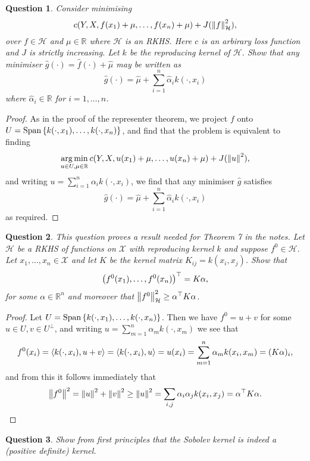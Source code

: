 \documentclass{article}
\theoremstyle{plain}
\newtheorem{question}{Question}
\theoremstyle{remark}
\newcommand{\Bb}{\mathbb}
\newcommand{\Cal}{\mathcal}
\newcommand{\RR}{\Bb R}
\newcommand\XX{\Cal X}
\newcommand\HH{\Cal H}
\DeclarePairedDelimiter{\ang}{\langle}{\rangle}
\newcommand{\T}{^\top} %
\renewcommand\P{^\perp}
\DeclareMathOperator{\Span}{Span}
\DeclareMathOperator*{\argmin}{arg\,min}
\begin{document}
\begin{question}
	Consider minimising
	\[
	c(Y, X, f(x_1) + \mu, \dotsc, f(x_n) + \mu) + J(\norm{f}^2_\HH),
	\]
	over $f \in \HH$ and $\mu \in \RR$ where $\HH$ is an RKHS. Here $c$ is an arbirary loss function and $J$ is strictly increasing. Let $k$ be the reproducing kernel of $\HH$. Show that any minimiser $\hat g(\cdot) = \hat f(\cdot) + \hat \mu$ may be written as
	\[
	\hat g(\cdot) = \hat \mu + \sum_{i=1}^n \hat\alpha_i k(\cdot, x_i)
	\]
	where $\hat\alpha_i \in \RR$ for $i = 1, \dotsc, n$. 
\end{question}

\begin{proof}
	As in the proof of the representer theorem, we project $f$ onto $U = \Span\qty{k(\cdot, x_1), \dotsc, k(\cdot, x_n)}$, and find that the problem is equivalent to finding
	\[
	\argmin_{u \in U, \mu \in \RR} c(Y, X, u(x_1) + \mu, \dotsc, u(x_n) + \mu) + J(\norm{u}^2),
	\]
	and writing $u = \sum_{i=1}^n \alpha_i k(\cdot, x_i)$, we find that any minimiser $\hat g$ satisfies
	\[
	\hat g(\cdot) = \hat \mu +  \sum_{i=1}^n \hat\alpha_i k(\cdot, x_i)
	\]
	as required. 
\end{proof}

\begin{question}
	This question proves a result needed for Theorem 7 in the notes. Let $\HH$ be a RKHS of functions on $\XX$ with reproducing kernel $k$ and suppose $f^0 \in \HH$. Let $x_1, \dotsc, x_n \in \XX$ and let $K$ be the kernel matrix $K_{ij} = k(x_i, x_j)$. Show that
	\[
	\qty(f^0(x_1), \dotsc, f^0(x_n))\T = K\alpha,
	\]
	for some $\alpha \in \RR^n$ and moreover that $\norm{f^0}^2_\HH \geq \alpha\T K\alpha$. 
\end{question}

\begin{proof}
	Let $U = \Span\qty{k(\cdot, x_1), \dotsc, k(\cdot, x_n)}$. Then we have $f^0 = u + v$ for some $u \in U, v \in U\P$, and writing $u = \sum_{m=1}^n \alpha_m k(\cdot, x_m)$ we see that 
		\[
	f^0(x_i) = \ang{k(\cdot, x_i), u + v} = \ang{k(\cdot, x_i), u} = u(x_i) = \sum_{m=1}^n \alpha_m k(x_i, x_m) = (K\alpha)_i,
	\]
	and from this it follows immediately that 
	\[
	\norm{f^0}^2 = \norm{u}^2 + \norm{v}^2 \geq \norm{u}^2 = \sum_{i, j} \alpha_i \alpha_j k(x_i, x_j) = \alpha\T K\alpha. 
	\]
\end{proof}

\begin{question}
	Show from first principles that the Sobolev kernel is indeed a (positive definite) kernel.
\end{question}
\end{document}

